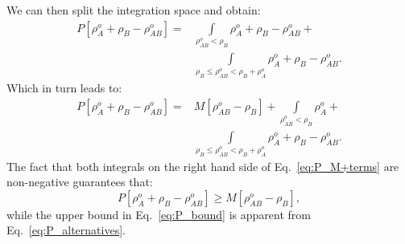 \documentclass[amsmath,amssymb,preprint,aip,jcp]{revtex4-1}
\begin{document}
We can then split the integration space and obtain:
\begin{align}
P[\rho^{o}_A + \rho_B - \rho_{AB}^o] = & \int\limits_{\rho_{AB}^o < \rho_B}\rho^{o}_A + \rho_B - \rho_{AB}^o + \\ \nonumber
 & \int\limits_{\rho_B \leq \rho_{AB}^o < \rho_B + \rho^{o}_A}\rho^{o}_A + \rho_B - \rho_{AB}^o.
\end{align}
Which in turn leads to:
\begin{align}\label{eq:P_M+terms}
 P[\rho^{o}_A + \rho_B - \rho_{AB}^o] =  &M[\rho_{AB}^o - \rho_B] + \int\limits_{\rho_{AB}^o < \rho_B}\rho^{o}_A + \\ \nonumber
 & \int\limits_{\rho_B \leq \rho_{AB}^o < \rho_B + \rho^{o}_A}\rho^{o}_A + \rho_B - \rho_{AB}^o.
\end{align}
The fact that both integrals on the right hand side of Eq.~\ref{eq:P_M+terms} are non-negative guarantees that:
\begin{equation}
 P[\rho^{o}_A + \rho_B - \rho_{AB}^o] \geq M[\rho_{AB}^o - \rho_B],
\end{equation}
while the upper bound in Eq.~\ref{eq:P_bound} is apparent from Eq.~\ref{eq:P_alternatives}.
\end{document}
